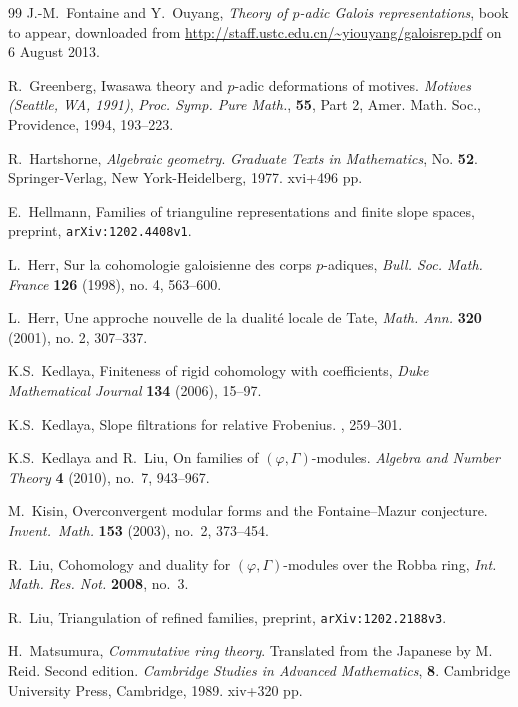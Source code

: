 \documentclass[12pt]{article}
\theoremstyle{definition}
\numberwithin{equation}{theorem}
\begin{document}
\begin{thebibliography}{99}
J.-M.~Fontaine and Y.~Ouyang, \textit{Theory of $p$-adic Galois
  representations}, book to appear, downloaded from
\url{http://staff.ustc.edu.cn/~yiouyang/galoisrep.pdf} on 6 August 2013.

 R.~Greenberg, Iwasawa theory and $p$-adic
  deformations of motives.  \textit{Motives (Seattle, WA, 1991)},
  \textit{Proc. Symp. Pure Math.}, {\bf 55}, Part 2, Amer. Math. Soc.,
  Providence, 1994, 193--223.

R.~Hartshorne, \textit{Algebraic geometry}. \textit{Graduate Texts in Mathematics}, No. \textbf{52}. Springer-Verlag, New York-Heidelberg, 1977. xvi+496 pp.

 E.~Hellmann, Families of trianguline representations and finite slope spaces, preprint, \texttt{arXiv:1202.4408v1}.

L.~Herr, Sur la cohomologie galoisienne des corps $p$-adiques, \textit{Bull. Soc. Math. France} {\bf 126}
(1998), no. 4, 563--600.

L.~Herr, Une approche nouvelle de la dualit\'e locale de Tate,
\textit{Math. Ann.} {\bf 320} (2001), no. 2, 307--337.

K.S.~Kedlaya, Finiteness of rigid cohomology with coefficients, \textit{Duke Mathematical Journal} \textbf{134} (2006), 15--97.

K.S.~Kedlaya, Slope filtrations for relative Frobenius.  \cite{R:Ast}, 259--301.

 K.S.~Kedlaya and R.~Liu, On families of
  $(\varphi,\Gamma)$-modules.  {\it Algebra and Number Theory} {\bf 4}
  (2010), no.~7, 943--967.

 M.~Kisin, Overconvergent modular forms and the
  Fontaine--Mazur conjecture.  {\it Invent.~Math.} {\bf 153} (2003),
  no.~2, 373--454.

 R.~Liu, Cohomology and duality for
  $(\varphi,\Gamma)$-modules over the Robba ring, {\it
  Int. Math. Res. Not.} {\bf 2008}, no.~3.

 R.~Liu, Triangulation of refined families, preprint,
\texttt{arXiv:1202.2188v3}.

H.~Matsumura, \textit{Commutative ring theory}. Translated from the Japanese by M. Reid. Second edition. \textit{Cambridge Studies in Advanced Mathematics}, \textbf{8}. Cambridge University Press, Cambridge, 1989. xiv+320 pp.



\end{thebibliography}
\end{document}
